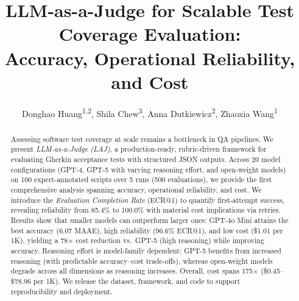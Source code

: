 \documentclass[letterpaper]{article} %
\begin{document}
\title{LLM-as-a-Judge for Scalable Test Coverage Evaluation:\\Accuracy, Operational Reliability, and Cost}

\author{
    Donghao Huang\textsuperscript{\rm 1,2},
    Shila Chew\textsuperscript{\rm 3},
    Anna Dutkiewicz\textsuperscript{\rm 2},
    Zhaoxia Wang\textsuperscript{\rm 1}
}


\maketitle

\begin{abstract}
Assessing software test coverage at scale remains a bottleneck in QA pipelines. We present \emph{LLM-as-a-Judge (LAJ)}, a production-ready, rubric-driven framework for evaluating Gherkin acceptance tests with structured JSON outputs. Across 20 model configurations (GPT-4, GPT-5 with varying reasoning effort, and open-weight models) on 100 expert-annotated scripts over 5 runs (500 evaluations), we provide the first comprehensive analysis spanning accuracy, operational reliability, and cost. We introduce the \emph{Evaluation Completion Rate} (ECR@1) to quantify first-attempt success, revealing reliability from 85.4\% to 100.0\% with material cost implications via retries. Results show that smaller models can outperform larger ones: GPT-4o Mini attains the best accuracy (6.07 MAAE), high reliability (96.6\% ECR@1), and low cost (\$1.01 per 1K), yielding a 78$\times$ cost reduction vs.\ GPT-5 (high reasoning) while improving accuracy. Reasoning effort is model-family dependent: GPT-5 benefits from increased reasoning (with predictable accuracy--cost trade-offs), whereas open-weight models degrade across all dimensions as reasoning increases. Overall, cost spans 175$\times$ (\$0.45--\$78.96 per 1K). We release the dataset, framework, and code to support reproducibility and deployment.
\end{abstract}
\end{document}

